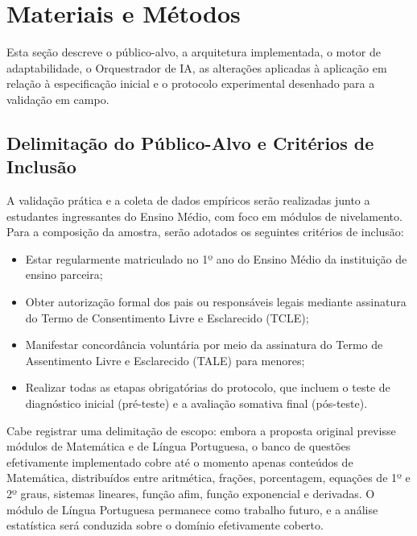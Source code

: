 \documentclass[10pt, a4paper, twocolumn]{article}
\begin{document}
\section{Materiais e Métodos}
\label{sec:metodologia}

Esta seção descreve o público-alvo, a arquitetura implementada, o motor de
adaptabilidade, o Orquestrador de IA, as alterações aplicadas à aplicação em
relação à especificação inicial e o protocolo experimental desenhado para a
validação em campo.

\subsection{Delimitação do Público-Alvo e Critérios de Inclusão}
\label{subsec:publico_alvo}

A validação prática e a coleta de dados empíricos serão realizadas junto a
estudantes ingressantes do Ensino Médio, com foco em módulos de nivelamento.
Para a composição da amostra, serão adotados os seguintes critérios de inclusão:

\begin{itemize}[leftmargin=0.4cm, itemsep=2pt, parsep=0pt]
    \item Estar regularmente matriculado no 1º ano do Ensino Médio da
    instituição de ensino parceira;
    \item Obter autorização formal dos pais ou responsáveis legais mediante
    assinatura do Termo de Consentimento Livre e Esclarecido (TCLE);
    \item Manifestar concordância voluntária por meio da assinatura do Termo de
    Assentimento Livre e Esclarecido (TALE) para menores;
    \item Realizar todas as etapas obrigatórias do protocolo, que incluem o teste
    de diagnóstico inicial (pré-teste) e a avaliação somativa final (pós-teste).
\end{itemize}

Cabe registrar uma delimitação de escopo: embora a proposta original previsse
módulos de Matemática e de Língua Portuguesa, o banco de questões efetivamente
implementado cobre até o momento apenas conteúdos de Matemática, distribuídos
entre aritmética, frações, porcentagem, equações de 1º e 2º graus, sistemas
lineares, função afim, função exponencial e derivadas. O módulo de Língua
Portuguesa permanece como trabalho futuro, e a análise estatística será
conduzida sobre o domínio efetivamente coberto.
\end{document}
